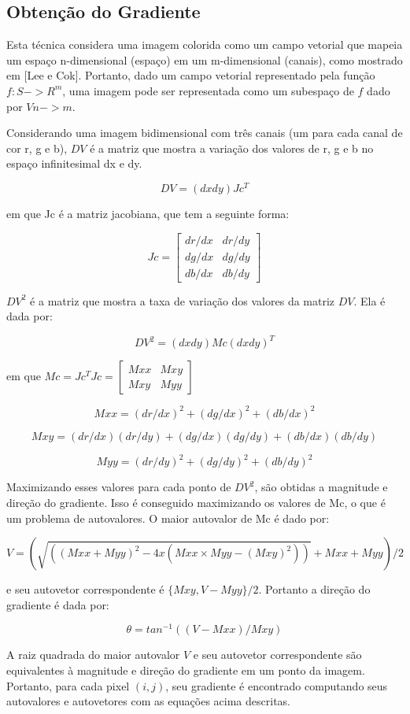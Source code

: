 \subsection{Obtenção do Gradiente}

Esta técnica considera uma imagem colorida como um campo vetorial que mapeia um espaço n-dimensional (espaço) em um m-dimensional (canais), como mostrado em [Lee e Cok]. Portanto, dado um campo vetorial representado pela função $ f: S->R^m $, uma imagem pode ser representada como um subespaço de $f$ dado por $ Vn->m $.

Considerando uma imagem bidimensional com três canais (um para cada canal de cor r, g e b), $DV$ é a matriz que mostra a variação dos valores de r, g e b no espaço infinitesimal dx e dy. 

$$ DV = (dx dy)Jc^T $$ 

em que Jc é a matriz jacobiana, que tem a seguinte forma:

$$ Jc = \begin{bmatrix} dr/dx & dr/dy \\ dg/dx & dg/dy \\ db/dx & db/dy \end{bmatrix} $$

$ DV^2 $ é a matriz que mostra a taxa de variação dos valores da matriz $DV$. Ela é dada por:

$$ DV^2 = (dx dy)Mc(dx dy)^T $$

em que $ Mc = Jc^T Jc = \begin{bmatrix} Mxx & Mxy \\ Mxy & Myy \end{bmatrix}$

$$ Mxx = (dr/dx)^2+(dg/dx)^2+(db/dx)^2 $$

$$ Mxy = (dr/dx)(dr/dy)+(dg/dx)(dg/dy)+(db/dx)(db/dy) $$

$$ Myy = (dr/dy)^2+(dg/dy)^2+(db/dy)^2 $$

Maximizando esses valores para cada ponto de $ DV^2 $, são obtidas a magnitude e direção do gradiente. Isso é conseguido maximizando os valores de Mc, o que é um problema de autovalores. O maior autovalor de Mc é dado por:

$$ V = (\sqrt{( (Mxx+Myy)^2 - 4 x(Mxx \times Myy - (Mxy)^2 ) )}+Mxx+ Myy)/2 $$

e seu autovetor correspondente é $ \{Mxy,V-Myy\}/2 $. Portanto a direção do gradiente é dada por:

$$ \theta = tan^{-1}((V-Mxx)/Mxy) $$

A raiz quadrada do maior autovalor $V$ e seu autovetor correspondente são equivalentes à magnitude e direção do gradiente em um ponto da imagem. Portanto, para cada pixel $(i,j)$, seu gradiente é encontrado computando seus autovalores e autovetores com as equações acima descritas.

